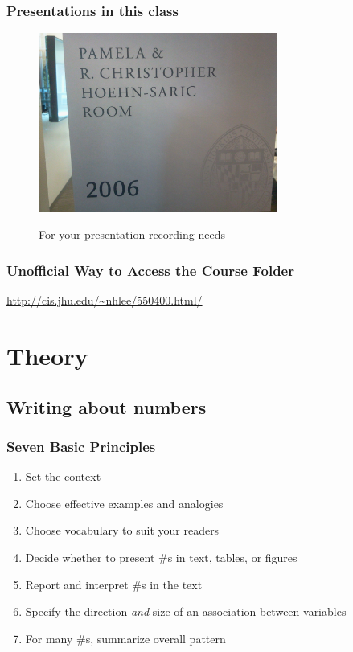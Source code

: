 \documentclass[hyperref={colorlinks=false},compress,handout,10pt]{beamer}
\let\olditem\item
\renewcommand{\item}{\setlength{\itemsep}{0.5\baselineskip}\olditem}
\begin{document}
\begin{frame}
    \frametitle{Presentations in this class}
    \begin{figure}
        \caption{For your presentation recording needs}
        \href{https://know.it.jhu.edu/display/TECHCLASS/Homewood+Campus}{
        \includegraphics[width=0.7\textwidth]{images/BLC2006.jpg}}
    \end{figure}
\end{frame}

\begin{frame}[fragile]
    \frametitle{Unofficial Way to Access the Course Folder}
    \vskip0.5in
    \begin{center}
        \href{http://cis.jhu.edu/~nhlee/550400.html/}{
            \url{http://cis.jhu.edu/~nhlee/550400.html/}
        }
    \end{center}
\end{frame}


\section{Theory}

\subsection{Writing about numbers}
\begin{frame}
    \frametitle{Seven Basic Principles}
     \begin{enumerate}
         \item Set the context 
         \item Choose effective examples and analogies
         \item Choose vocabulary to suit your readers
         \item Decide whether to present \#s in text, tables, or figures
         \item Report and interpret \#s in the text
         \item Specify the direction \emph{and} size of an association between variables
         \item For many \#s, summarize overall pattern 
     \end{enumerate}
\end{frame}
\end{document}
